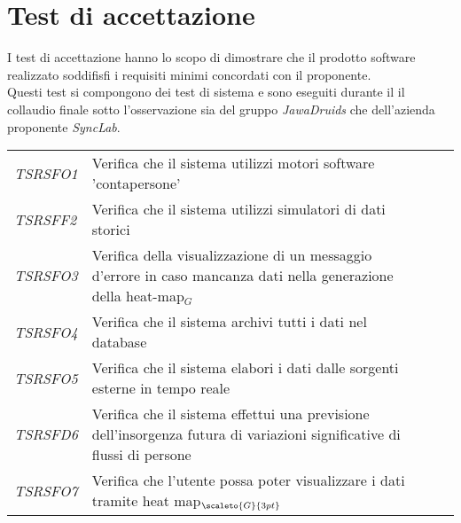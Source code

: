 {{{\section{Test di accettazione}\label{SpecificaDeiTestTestDiAccettazione}
I test di accettazione hanno lo scopo di dimostrare che il prodotto software realizzato soddifisfi i requisiti minimi concordati con il proponente. \\
Questi test si compongono dei test di sistema e sono eseguiti durante il il collaudio finale sotto l'osservazione sia del gruppo \textit{JawaDruids} che dell'azienda proponente \textit{SyncLab}.

\def\tabularxcolumn#1{m{#1}}
{

	\begin{center}
		\renewcommand{\arraystretch}{1.4}
		\begin{longtable}{|p{3cm}|p{8cm}|p{2cm}|p{2cm}|}
			\hline
			\rowcolor{airforceblue}
			\makecell[c]{\textbf{Id Test}} & \makecell[c]{\textbf{Descrizione}} & \makecell[c]{\textbf{Esito}} & \makecell[c]{\textbf{Qualità}} \\
			\hline
			\textit{TSRSFO1} & Verifica che il sistema utilizzi motori software 'contapersone' & \makecell[tc]{\textit{I}} & \makecell[tc]{\textit{S}} \\
			\hline
			\textit{TSRSFF2} & Verifica che il sistema utilizzi simulatori di dati storici & \makecell[tc]{\textit{NI}} & \makecell[tc]{\textit{-}}\\
			\hline
			\textit{TSRSFO3} & Verifica della visualizzazione di un messaggio d'errore in caso mancanza dati nella generazione della heat-map$_G$ &\makecell[tc]{\textit{I}} & \makecell[tc]{\textit{S}}\\
			\hline
			\textit{TSRSFO4} & Verifica che il sistema archivi tutti i dati nel database & \makecell[tc]{\textit{I}} & \makecell[tc]{\textit{S}}\\
			\hline
			\textit{TSRSFO5} & Verifica che il sistema elabori i dati dalle sorgenti esterne in tempo reale & \makecell[tc]{\textit{I}} & \makecell[tc]{\textit{S}}\\
			\hline
			\textit{TSRSFD6} & Verifica che il sistema effettui una previsione dell’insorgenza futura di variazioni significative di flussi di persone & \makecell[tc]{\textit{NI}} & \makecell[tc]{\textit{-}}\\
			\hline
			\textit{TSRSFO7} & Verifica che l’utente possa poter visualizzare i dati tramite heat map$_{\scaleto{G}{3pt}}$ & \makecell[tc]{\textit{I}} & \makecell[tc]{\textit{S}}\\

\end{longtable}
\end{center}}}}}
